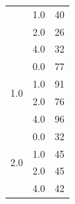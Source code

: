 \begin{longtable}{|c|c|c|c|c|}
& \multicolumn{2}{c|}{1.0} & \multicolumn{2}{c|}{40} \\
& \multicolumn{2}{c|}{2.0} & \multicolumn{2}{c|}{26} \\
& \multicolumn{2}{c|}{4.0} & \multicolumn{2}{c|}{32} \\
\hline
\multirow{4}{*}{1.0} & \multicolumn{2}{c|}{0.0} & \multicolumn{2}{c|}{77} \\
& \multicolumn{2}{c|}{1.0} & \multicolumn{2}{c|}{91} \\
& \multicolumn{2}{c|}{2.0} & \multicolumn{2}{c|}{76} \\
& \multicolumn{2}{c|}{4.0} & \multicolumn{2}{c|}{96} \\
\hline
\multirow{4}{*}{2.0} & \multicolumn{2}{c|}{0.0} & \multicolumn{2}{c|}{32} \\
& \multicolumn{2}{c|}{1.0} & \multicolumn{2}{c|}{45} \\
& \multicolumn{2}{c|}{2.0} & \multicolumn{2}{c|}{45} \\
& \multicolumn{2}{c|}{4.0} & \multicolumn{2}{c|}{42} \\
\hline
\end{longtable}


